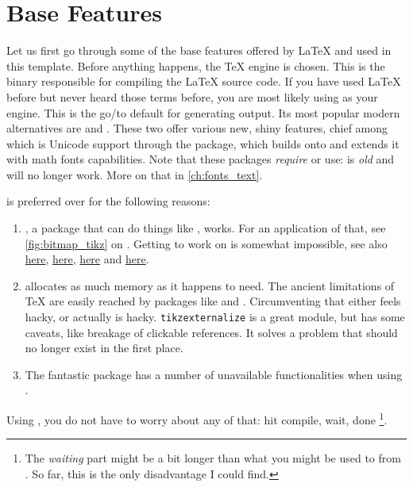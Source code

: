 \chapter{Base Features}
\label{ch:base-features}

Let us first go through some of the base features offered by \LaTeX{} and used in
this template.
Before anything happens, the \TeX{} engine is chosen.
This is the binary responsible for compiling the \LaTeX{} source code.
If you have used \LaTeX{} before but never heard those terms before, you are most
likely using  as your engine.
This is the go\-/to default for generating  output.
Its most popular modern alternatives are  and .
These two offer various new, shiny features, chief among which is Unicode
support through the  package, which builds onto
 and extends it with math fonts capabilities.
Note that these packages \emph{require}  or  use:
 is \emph{old} and will no longer work.
More on that in \cref{ch:fonts_text}.

 is preferred over  for the following reasons:
\begin{enumerate}
    \item {}, a package that can do things like
          , works.
          For an application of that, see \cref{fig:bitmap_tikz} on
          .
          Getting  to work on  is somewhat impossible,
          see also
          \href{https://tex.stackexchange.com/questions/421970/contour-text-in-xelatex}{here},
          \href{https://tex.stackexchange.com/questions/354410/how-should-the-effects-of-manipulating-specials-be-switched-off}{here},
          \href{https://tex.stackexchange.com/questions/225637/how-to-add-outline-to-a-character-under-xelatex}{here} and
          \href{https://tex.stackexchange.com/questions/25221/outlined-characters}{here}.
    \item {} allocates as much memory as it happens to need.
          The ancient limitations of \TeX{} are easily reached by packages like
           and .
          Circumventing that either feels hacky, or actually is hacky.
          \texttt{tikzexternalize} is a great module, but has some caveats, like
          breakage of clickable references.
          It solves a problem that should no longer exist in the first place.
    \item The fantastic  package has a number of unavailable
          functionalities when using .
\end{enumerate}
Using , you do not have to worry about any of that:
hit compile, wait, done%
\footnote{
    The \emph{waiting} part might be a bit longer than what you might be used to
    from .
    So far, this is the only disadvantage I could find.
}.

